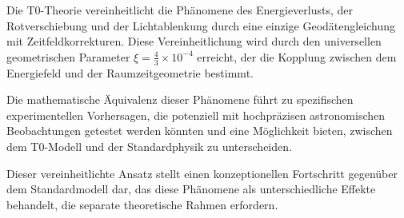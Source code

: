 \documentclass[12pt,a4paper]{article}
\theoremstyle{definition}
\begin{document}
	Die T0-Theorie vereinheitlicht die Phänomene des Energieverlusts, der Rotverschiebung und der Lichtablenkung durch eine einzige Geodätengleichung mit Zeitfeldkorrekturen. Diese Vereinheitlichung wird durch den universellen geometrischen Parameter $\xi = \frac{4}{3} \times 10^{-4}$ erreicht, der die Kopplung zwischen dem Energiefeld und der Raumzeitgeometrie bestimmt.
	
	Die mathematische Äquivalenz dieser Phänomene führt zu spezifischen experimentellen Vorhersagen, die potenziell mit hochpräzisen astronomischen Beobachtungen getestet werden könnten und eine Möglichkeit bieten, zwischen dem T0-Modell und der Standardphysik zu unterscheiden.
	
	Dieser vereinheitlichte Ansatz stellt einen konzeptionellen Fortschritt gegenüber dem Standardmodell dar, das diese Phänomene als unterschiedliche Effekte behandelt, die separate theoretische Rahmen erfordern.
	
\end{document}
